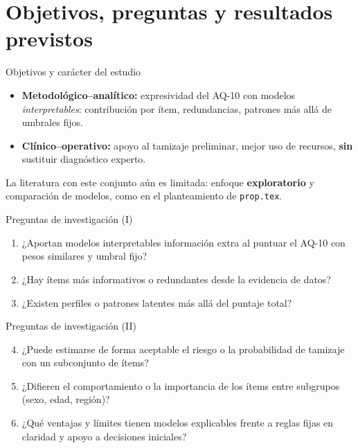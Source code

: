 \documentclass[11pt]{beamer}
\begin{document}
\section{Objetivos, preguntas y resultados previstos}

\begin{frame}{Objetivos y carácter del estudio}
  \begin{itemize}
    \setlength{\itemsep}{0.3em}
    \item \textbf{Metodológico--analítico:} expresividad del AQ-10 con modelos \emph{interpretables}: contribución por ítem, redundancias, patrones más allá de umbrales fijos.
    \item \textbf{Clínico--operativo:} apoyo al tamizaje preliminar, mejor uso de recursos, \textbf{sin} sustituir diagnóstico experto.
  \end{itemize}
  \vspace{0.4em}
  {\footnotesize La literatura con este conjunto aún es limitada: enfoque \textbf{exploratorio} y comparación de modelos, como en el planteamiento de \texttt{prop.tex}.}
\end{frame}

\begin{frame}{Preguntas de investigación (I)}
  \begin{enumerate}
    \setlength{\itemsep}{0.25em}
    \item ¿Aportan modelos interpretables información extra al puntuar el AQ-10 con pesos similares y umbral fijo?
    \item ¿Hay ítems más informativos o redundantes desde la evidencia de datos?
    \item ¿Existen perfiles o patrones latentes más allá del puntaje total?
  \end{enumerate}
\end{frame}

\begin{frame}{Preguntas de investigación (II)}
  \begin{enumerate}
    \setcounter{enumi}{3}
    \setlength{\itemsep}{0.25em}
    \item ¿Puede estimarse de forma aceptable el riesgo o la probabilidad de tamizaje con un subconjunto de ítems?
    \item ¿Difieren el comportamiento o la importancia de los ítems entre subgrupos (sexo, edad, región)?
    \item ¿Qué ventajas y límites tienen modelos explicables frente a reglas fijas en claridad y apoyo a decisiones iniciales?
  \end{enumerate}
\end{frame}
\end{document}
